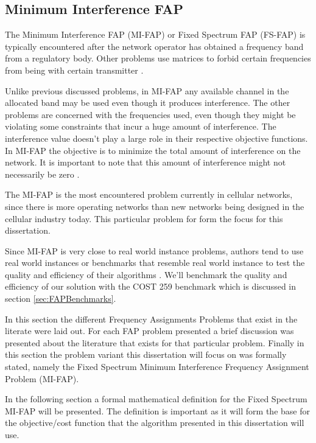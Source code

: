 \subsection{Minimum Interference FAP}
The Minimum Interference FAP (MI-FAP) or Fixed Spectrum FAP (FS-FAP) is typically encountered after the network operator has obtained a frequency band from a regulatory body. Other problems use matrices to forbid certain frequencies from being with certain transmitter \cite{Karen2004,Eisenblatter,MontemanniThesis,MultipleBinaryFAP}. 

Unlike previous discussed problems, in MI-FAP any available channel in the allocated band may be used even though it produces interference. The other problems are concerned with the frequencies used, even though they might be violating some constraints that incur a huge amount of interference\cite{Karen2004,Eisenblatter,MontemanniThesis,MultipleBinaryFAP}. The interference value doesn't play a large role in their respective objective functions\cite{Karen2004,Eisenblatter,MontemanniThesis,MultipleBinaryFAP}. In MI-FAP the objective is to minimize the total amount of interference on the network. It is important to note that this amount of interference might not necessarily be zero \cite{Karen2004,Eisenblatter,MontemanniThesis,MultipleBinaryFAP}.

The MI-FAP is the most encountered problem currently in cellular networks, since there is more operating networks than new networks being designed in the cellular industry today. This particular problem for form the focus for this dissertation. 

Since MI-FAP is very close to real world instance problems, authors tend to use real world instances or benchmarks that resemble real world instance to test the quality and efficiency of their algorithms \cite{Karen2004,Eisenblatter,MontemanniThesis,MultipleBinaryFAP}. We'll benchmark the quality and efficiency of our solution with the COST 259 benchmark which is discussed in section \ref{sec:FAPBenchmarks}.

In this section the different Frequency Assignments Problems that exist in the literate were laid out. For each FAP problem presented a brief discussion was presented about the literature that exists for that particular problem. Finally in this section the problem variant this dissertation will focus on was formally stated, namely the Fixed Spectrum Minimum Interference Frequency Assignment Problem (MI-FAP). 

In the following section a formal mathematical definition for the Fixed Spectrum MI-FAP will be presented. The definition is important as it will form the base for the objective/cost function that the algorithm presented in this dissertation will use.
